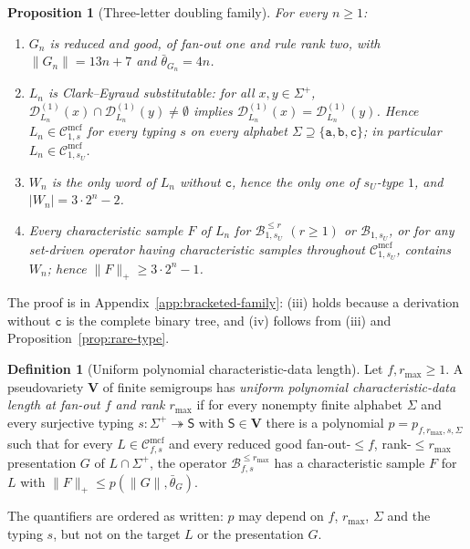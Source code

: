\documentclass[11pt]{article}
\numberwithin{equation}{section}
\theoremstyle{plain}
\newtheorem{proposition}[theorem]{Proposition}
\theoremstyle{definition}
\newtheorem{definition}[theorem]{Definition}
\theoremstyle{remark}
\newcommand{\Cmcf}[2]{\mathcal{C}^{\mathrm{mcf}}_{#1,#2}}
\newcommand{\D}{\mathcal{D}}
\theoremstyle{plain}
\begin{document}
\begin{proposition}[Three-letter doubling family]
\label{prop:bracketed-family}
\label{prop:three-letter-family}
For every $n\ge1$:
\begin{enumerate}[label=\textup{(\roman*)},leftmargin=*]
\item $G_n$ is reduced and good, of fan-out one and rule rank two, with
$\|G_n\|=13n+7$ and $\bar\theta_{G_n}=4n$.
\item $L_n$ is Clark--Eyraud substitutable: for all $x,y\in\Sigma^+$,
$\D^{(1)}_{L_n}(x)\cap\D^{(1)}_{L_n}(y)\ne\emptyset$ implies
$\D^{(1)}_{L_n}(x)=\D^{(1)}_{L_n}(y)$. Hence $L_n\in\Cmcf{1}{s}$ for every
typing $s$ on every alphabet $\Sigma\supseteq\{\mathtt a,\mathtt b,\mathtt c\}$; in
particular $L_n\in\Cmcf{1}{s_U}$.
\item $W_n$ is the only word of $L_n$ without $\mathtt c$, hence the only one of
$s_U$-type $1$, and $|W_n|=3\cdot2^n-2$.
\item Every characteristic sample $F$ of $L_n$ for
$\mathcal B^{\le r}_{1,s_U}$ $(r\ge1)$ or $\mathcal B_{1,s_U}$, or for any
set-driven operator having characteristic samples throughout
$\Cmcf{1}{s_U}$, contains $W_n$; hence $\|F\|_+\ge3\cdot2^n-1$.
\end{enumerate}
\end{proposition}

The proof is in Appendix~\ref{app:bracketed-family}: (iii) holds because a
derivation without $\mathtt c$ is the complete binary tree, and (iv) follows from
(iii) and Proposition~\ref{prop:rare-type}.

\begin{definition}[Uniform polynomial characteristic-data length]
\label{def:uniform-polydata}
Let $f,r_{\max}\ge1$.  A pseudovariety $\mathbf V$ of finite semigroups
has \emph{uniform polynomial characteristic-data length at fan-out $f$ and
rank $r_{\max}$} if for every nonempty finite alphabet $\Sigma$ and every
surjective typing $s:\Sigma^+\twoheadrightarrow\mathsf S$ with
$\mathsf S\in\mathbf V$ there is a polynomial $p=p_{f,r_{\max},s,\Sigma}$
such that for every $L\in\Cmcf{f}{s}$ and every reduced good
fan-out-$\le f$, rank-$\le r_{\max}$ presentation $G$ of $L\cap\Sigma^+$,
the operator $\mathcal B^{\le r_{\max}}_{f,s}$ has a characteristic sample
$F$ for $L$ with $\|F\|_+\le p(\|G\|,\bar\theta_G)$.
\end{definition}

The quantifiers are ordered as written: $p$ may depend on $f$,
$r_{\max}$, $\Sigma$ and the typing $s$, but not on the target $L$ or the
presentation $G$.
\end{document}
